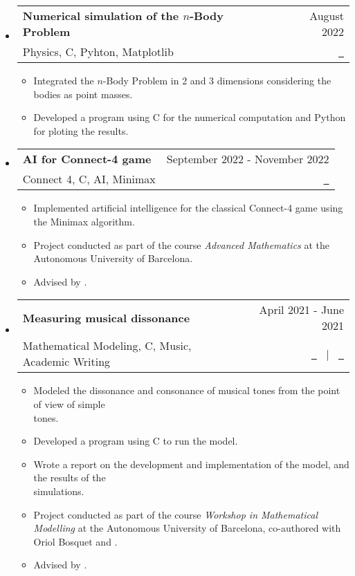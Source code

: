 \documentclass[a4paper,11pt]{article}
\makeatletter
\newcommand{\resumeQuadHeading}[4]{
  \item
  \begin{tabular*}{0.96\textwidth}[t]{l@{\extracolsep{\fill}}r}
    \textbf{#1} & \small #2 \\
    \small#3 & \small #4 \\
  \end{tabular*}
}
\newcommand{\resumeHeadingListStart}{
  \begin{itemize}[leftmargin=0.15in, label={}]
}
\newcommand{\resumeHeadingListEnd}{\end{itemize}}
\makeatother
\begin{document}
\resumeHeadingListStart{}
\resumeQuadHeading{Numerical simulation of the $n$-Body Problem}{August 2022}{Physics, C, Pyhton, Matplotlib}{\href{https://github.com/victorballester7/n-body_problem}{\faGithub \ \graydotuline{Code}}}
\begin{itemize}[leftmargin=3em, itemsep=0.1em, topsep=2pt]
  \item \small Integrated the $n$-Body Problem in 2 and 3 dimensions considering the bodies as point masses.
  \item \small Developed a program using C for the numerical computation and Python for ploting the results.
\end{itemize}
\resumeHeadingListEnd{}

\resumeHeadingListStart{}
\resumeQuadHeading{AI for Connect-4 game}{September 2022 - November 2022}{Connect 4, C, AI, Minimax}{\href{https://github.com/victorballester7/connect4}{\faGithub \ \graydotuline{Code}}}
\begin{itemize}[leftmargin=3em, itemsep=0.1em, topsep=2pt]
  \item \small Implemented artificial intelligence for the classical Connect-4 game using the Minimax algorithm.
  \item \small Project conducted as part of the course \textit{Advanced Mathematics} at the Autonomous University of Barcelona.
  \item \small Advised by \href{https://portalrecerca.uab.cat/en/persons/vicente-soler-ruz}{}.
\end{itemize}
\resumeHeadingListEnd{}


\resumeHeadingListStart{}
\resumeQuadHeading{Measuring musical dissonance}{April 2021 - June 2021}{Mathematical Modeling, C, Music, Academic Writing}{\href{https://github.com/victorballester7/dissonance/blob/main/latex/main.pdf}{\faFileTextO \ \graydotuline{{Report \scriptsize (in Catalan)}}} \ $|$ \ \href{https://github.com/victorballester7/dissonance}{\faGithub \ \graydotuline{Code}}}
\begin{itemize}[leftmargin=3em, itemsep=0.1em, topsep=2pt]
  \item \small Modeled the dissonance and consonance of musical tones from the point of view of simple\\ tones.
  \item \small Developed a program using C to run the model.
  \item \small Wrote a report on the development and implementation of the model, and the results of the\\ simulations.
  \item \small Project conducted as part of the course \textit{Workshop in Mathematical Modelling} at the Autonomous University of Barcelona, co-authored with Oriol Bosquet and \href{https://github.com/carlosala}{}.
  \item \small Advised by \href{https://mat.uab.cat/departament/uab/pop_ex.php?id=208&lang=}{}.
\end{itemize}
\resumeHeadingListEnd{}
\end{document}

